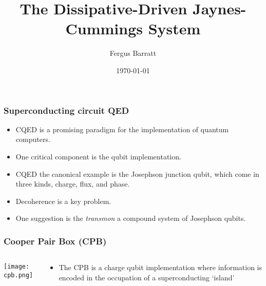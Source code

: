 \documentclass{beamer}
\title{The Dissipative-Driven Jaynes-Cummings System}
\date{\today}
\author{Fergus Barratt}
\begin{document}
\maketitle

\begin{frame}
    \frametitle{Superconducting circuit QED}         
    \begin{itemize}
        \item CQED is a promising paradigm for the implementation of 
                quantum computers. 
        \item One critical component is the qubit implementation.
        \item CQED the canonical example is the Josephson junction 
                qubit, which come in three kinds, charge, flux, and 
                phase. 
        \item Decoherence is a key problem.
        \item One suggestion is the \emph{transmon}
                a compound system of Josephson qubits.
    \end{itemize}
\end{frame}
\begin{frame}
    \frametitle{Cooper Pair Box (CPB)}
    \begin{columns}[c]
        \begin{column}{0.4\linewidth}
            \texttt{[image: cpb.png]}
        \end{column}
        \begin{column}{0.6\linewidth}
            \begin{itemize}
                \item The CPB is a charge qubit implementation where 
                    information is encoded in the occupation of a 
                    superconducting `island'
            \end{itemize}
        \end{column}
    \end{columns}
\end{frame}
\end{document}
